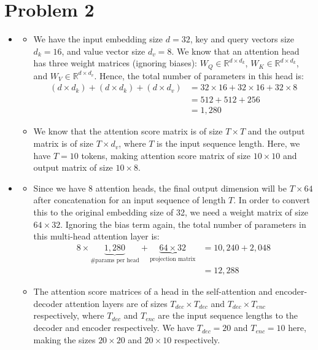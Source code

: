 \documentclass{article}
\begin{document}
\section{Problem 2}
  \begin{itemize}
    \item[\textbf{2.1}]
    \begin{itemize}
      \item[1)] We have the input embedding size $d = 32$, key and query vectors size $d_k = 16$, and value vector size $d_v = 8$.
      We know that an attention head has three weight matrices (ignoring biases): $W_Q \in \mathbb{R}^{d \times d_k}$, $W_K \in \mathbb{R}^{d \times d_k}$, and $W_V \in \mathbb{R}^{d \times d_v}$.
      Hence, the total number of parameters in this head is:
      \begin{align*}
        (d \times d_k) + (d \times d_k) + (d \times d_v) &= 32 \times 16 + 32 \times 16 + 32 \times 8 \\
        &= 512 + 512 + 256 \\
        &= 1,280
      \end{align*}

      \item[2)] We know that the attention score matrix is of size $T \times T$ and the output matrix is of size $T \times d_v$, where $T$ is the input sequence length.
      Here, we have $T = 10$ tokens, making attention score matrix of size $10 \times 10$ and output matrix of size $10 \times 8$.
    \end{itemize}

    \item[\textbf{2.2}]
    \begin{itemize}
      \item[1)] Since we have 8 attention heads, the final output dimension will be $T \times 64$ after concatenation for an input sequence of length $T$.
      In order to convert this to the original embedding size of 32, we need a weight matrix of size $64 \times 32$.
      Ignoring the bias term again, the total number of parameters in this multi-head attention layer is:
      \begin{align*}
        8 \times \underbrace{1,280}_{\text{\#params per head}} + \underbrace{64 \times 32}_{\text{projection matrix}} &= 10,240 + 2,048 \\
        &= 12,288
      \end{align*}

      \item[2)] The attention score matrices of a head in the self-attention and encoder-decoder attention layers are of sizes $T_{dec} \times T_{dec}$ and $T_{dec} \times T_{enc}$ respectively, where $T_{dec}$ and $T_{enc}$ are the input sequence lengths to the decoder and encoder respectively.
      We have $T_{dec} = 20$ and $T_{enc} = 10$ here, making the sizes $20 \times 20$ and $20 \times 10$ respectively.


\end{itemize}
\end{itemize}
\end{document}
